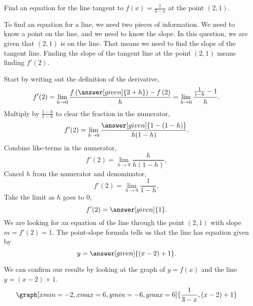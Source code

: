 \documentclass{ximera}
\begin{document}
\begin{example}
  Find an equation for the line tangent to $f(x) = \frac{1}{3-x}$ at the point $(2, 1)$.
  \begin{explanation}
    To find an equation for a line, we need two pieces of information.  We need to know
    a point on the line, and we need to know the slope.  In this question, we are given
    that $(2,1)$ is on the line.  That means we need to find the slope of the tangent line.
    Finding the slope of the tangent line at the point $(2,1)$ means finding $f'(2)$.
    
    Start by writing out the definition of the derivative,
    \[
    f'(2) = \lim_{h\to 0} \frac{f\left(\answer[given]{2+h}\right)-f\left(2\right)}{h} = \lim_{h\to 0} \frac{\frac{1}{1-h} - 1}{h}.
    \]
    Multiply by $\frac{1-h}{1-h}$ to clear the fraction in the numerator,
    \[
    f'(2) = \lim_{h\to 0} \frac{\answer[given]{1 - (1-h)}}{h(1-h)}.
    \]
    Combine like-terms in the numerator,
    \[
    f'(2) = \lim_{h\to 0} \frac{h}{h(1-h)},
    \]
    Cancel $h$ from the numerator and denominator,
    \[
    f'(2) = \lim_{h\to 0} \frac{1}{1-h},
    \]		
    Take the limit as $h$ goes to $0$,
    \[
    f'(2) = \answer[given]{1}.
    \]
    We are looking for an equation of the line through the point
    $(2,1)$ with slope $m = f'(2) = 1$.  The point-slope formula tells
    us that the line has equation given by
    \[
    y= \answer[given]{(x-2) + 1}.
    \]
  \begin{onlineOnly}
  We can confirm our results by looking at the graph of $y=f(x)$ and the line $y=(x-2)+1$. 
  \[
  \graph[xmin=-2,xmax=6,ymin=-6,ymax=6]{\frac{1}{3-x}, (x-2)+1}
  \]
  \end{onlineOnly}
  \end{explanation}
\end{example}
\end{document}
